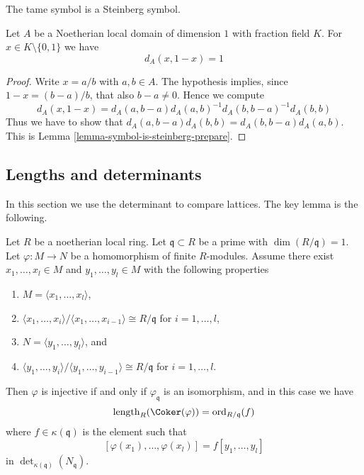 \noindent
The tame symbol is a Steinberg symbol.

\begin{lemma}
\label{lemma-symbol-is-steinberg}
Let $A$ be a Noetherian local domain of dimension $1$
with fraction field $K$. For $x \in K \setminus \{0, 1\}$
we have
$$
d_A(x, 1 -x) = 1
$$
\end{lemma}

\begin{proof}
Write $x = a/b$ with $a, b \in A$.
The hypothesis implies, since $1 - x = (b - a)/b$,
that also $b - a \not = 0$. Hence we compute
$$
d_A(x, 1 - x)
=
d_A(a, b - a)d_A(a, b)^{-1}d_A(b, b - a)^{-1}d_A(b, b)
$$
Thus we have to show that
$d_A(a, b - a) d_A(b, b) = d_A(b, b - a) d_A(a, b)$.
This is Lemma \ref{lemma-symbol-is-steinberg-prepare}.
\end{proof}










\subsection{Lengths and determinants}
\label{subsection-length-determinant}

\noindent
In this section we use the determinant to compare lattices.
The key lemma is the following.

\begin{lemma}
\label{lemma-key-lemma}
Let $R$ be a noetherian local ring.
Let $\mathfrak q \subset R$ be a prime with $\dim(R/\mathfrak q) = 1$.
Let $\varphi : M \to N$ be a homomorphism of finite $R$-modules.
Assume there exist $x_1, \ldots, x_l \in M$ and $y_1, \ldots, y_l \in M$
with the following properties
\begin{enumerate}
\item $M = \langle x_1, \ldots, x_l\rangle$,
\item $\langle x_1, \ldots, x_i\rangle / \langle x_1, \ldots, x_{i - 1}\rangle
\cong R/\mathfrak q$ for $i = 1, \ldots, l$,
\item $N = \langle y_1, \ldots, y_l\rangle$, and
\item $\langle y_1, \ldots, y_i\rangle / \langle y_1, \ldots, y_{i - 1}\rangle
\cong R/\mathfrak q$ for $i = 1, \ldots, l$.
\end{enumerate}
Then $\varphi$ is injective if and only if $\varphi_{\mathfrak q}$ is an
isomorphism, and in this case we have
$$
\text{length}_R(\Coker(\varphi)) = \text{ord}_{R/\mathfrak q}(f)
$$
where $f \in \kappa(\mathfrak q)$ is the element such that
$$
[\varphi(x_1), \ldots, \varphi(x_l)] = f [y_1, \ldots, y_l]
$$
in $\det_{\kappa(\mathfrak q)}(N_{\mathfrak q})$.
\end{lemma}

